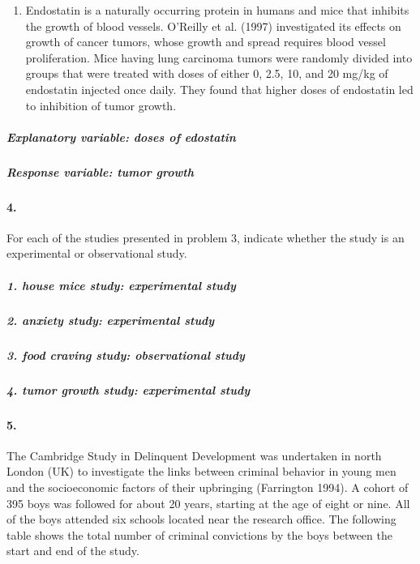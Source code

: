 \documentclass[]{article}
\providecommand{\tightlist}{%
  \setlength{\itemsep}{0pt}\setlength{\parskip}{0pt}}
\let\oldparagraph\paragraph
\renewcommand{\paragraph}[1]{\oldparagraph{#1}\mbox{}}
\let\oldsubparagraph\subparagraph
\renewcommand{\subparagraph}[1]{\oldsubparagraph{#1}\mbox{}}
\begin{document}
\begin{enumerate}
\def\labelenumi{\alph{enumi}.}
\setcounter{enumi}{3}
\tightlist
\item
  Endostatin is a naturally occurring protein in humans and mice that
  inhibits the growth of blood vessels. O'Reilly et al. (1997)
  investigated its effects on growth of cancer tumors, whose growth and
  spread requires blood vessel proliferation. Mice having lung carcinoma
  tumors were randomly divided into groups that were treated with doses
  of either 0, 2.5, 10, and 20 mg/kg of endostatin injected once daily.
  They found that higher doses of endostatin led to inhibition of tumor
  growth.
\end{enumerate}

\subparagraph{Explanatory variable: doses of
edostatin}\label{explanatory-variable-doses-of-edostatin}

\subparagraph{Response variable: tumor
growth}\label{response-variable-tumor-growth}

\paragraph{4.}\label{section-3}

For each of the studies presented in problem 3, indicate whether the
study is an experimental or observational study.

\subparagraph{1. house mice study: experimental
study}\label{house-mice-study-experimental-study}

\subparagraph{2. anxiety study: experimental
study}\label{anxiety-study-experimental-study}

\subparagraph{3. food craving study: observational
study}\label{food-craving-study-observational-study}

\subparagraph{4. tumor growth study: experimental
study}\label{tumor-growth-study-experimental-study}

\paragraph{5.}\label{section-4}

The Cambridge Study in Delinquent Development was undertaken in north
London (UK) to investigate the links between criminal behavior in young
men and the socioeconomic factors of their upbringing (Farrington 1994).
A cohort of 395 boys was followed for about 20 years, starting at the
age of eight or nine. All of the boys attended six schools located near
the research office. The following table shows the total number of
criminal convictions by the boys between the start and end of the study.
\end{document}
